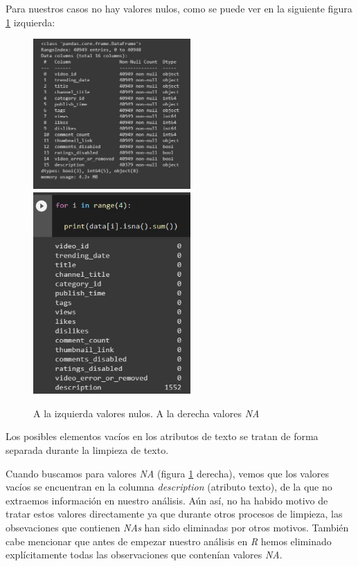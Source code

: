 \documentclass[a4paper,12pt]{article}
\begin{document}
Para nuestros casos no hay valores nulos, como se puede ver en la siguiente figura \ref{fig:nula} izquierda:

\begin{figure}[h!]
\centering
\includegraphics[width=6cm]{vacio_datos.JPG}
\includegraphics[width=6cm]{Na_values.JPG}
\caption{A la izquierda valores nulos. A la derecha valores {\itshape NA}}
\label{fig:nula}
\end{figure}

Los posibles elementos vac\'ios en los atributos de texto se tratan de forma separada durante la limpieza de texto.

Cuando buscamos para valores {\itshape NA} (figura \ref{fig:nula} derecha), vemos que los valores vac\'ios se encuentran en la columna {\itshape description} (atributo texto), de la que no extraemos informaci\'on en nuestro an\'alisis. A\'un as\'i, no ha habido motivo de tratar estos valores directamente ya que durante otros procesos de limpieza, las obsevaciones  que contienen {\itshape NAs} han sido eliminadas por otros motivos. Tambi\'en cabe mencionar que antes de empezar nuestro an\'alisis en {\itshape R} hemos eliminado expl\'icitamente todas las observaciones que conten\'ian valores {\itshape NA}.
\end{document}
